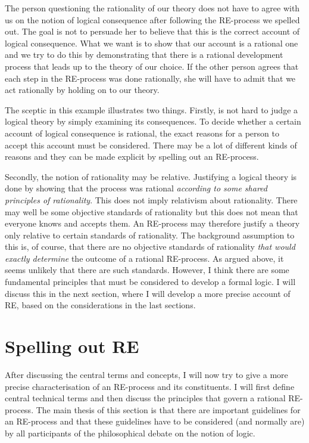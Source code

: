 \documentclass{article}
\begin{document}
The person questioning the rationality of our theory does not have to agree with us on the notion of logical consequence after following the RE-process we spelled out. The goal is not to persuade her to believe that this is the correct account of logical consequence. What we want is to show that our account is a rational one and we try to do this by demonstrating that there is a rational development process that leads up to the theory of our choice. If the other person agrees that each step in the RE-process was done rationally, she will have to admit that we act rationally by holding on to our theory. %

The sceptic in this example illustrates two things. Firstly, is not hard to judge a logical theory by simply examining its consequences. To decide whether a certain account of logical consequence is rational, the exact reasons for a person to accept this account must be considered. There may be a lot of different kinds of reasons and they can be made explicit by spelling out an RE-process. 

Secondly, the notion of rationality may be relative. Justifying a logical theory is done by showing that the process was rational \textit{according to some shared principles of rationality}. This does not imply relativism about rationality. There may well be some objective standards of rationality but this does not mean that everyone knows and accepts them. An RE-process may therefore justify a theory only relative to certain standards of rationality. The background assumption to this is, of course, that there are no objective standards of rationality \textit{that would exactly determine} the outcome of a rational RE-process. As argued above, it seems unlikely that there are such standards. However, I think there are some fundamental principles that must be considered to develop a formal logic. I will discuss this in the next section, where I will develop a more precise account of RE, based on the considerations in the last sections.

\section{Spelling out RE}\label{sec:spelling_out}
After discussing the central terms and concepts, I will now try to give a more precise characterisation of an RE-process and its constituents. I will first define central technical terms and then discuss the principles that govern a rational RE-process. The main thesis of this section is that there are important guidelines for an RE-process and that these guidelines have to be considered (and normally are) by all participants of the philosophical debate on the notion of logic.
\end{document}
